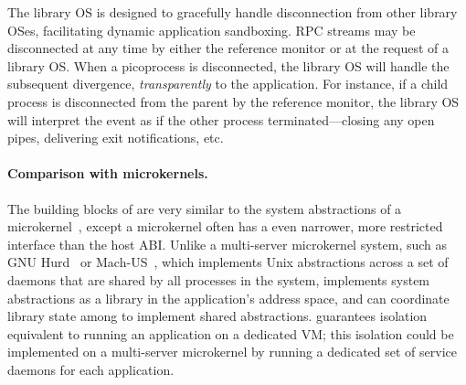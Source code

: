 The \graphene{} library OS is designed to gracefully handle disconnection from other library OSes, facilitating dynamic application sandboxing.
RPC streams may be disconnected at any time by either the reference monitor or at the request of a library OS.
When a picoprocess is disconnected, the library OS will handle the subsequent
divergence, %
{\em transparently} to the application.
For instance, if a child process is disconnected from the parent by the reference monitor, the library OS will interpret the event as if the other process terminated---closing any open pipes, delivering exit notifications, etc.



\paragraph{Comparison with microkernels.}
The building blocks of \graphene{} are very similar to the system abstractions of a 
microkernel~\cite{liedtke95sosp,klein09sel4,elphinstone13microkernels,liedtke93sosp,chen93memory,baron1985mach-1,accetta86mach}, except a microkernel often has a even narrower, more restricted interface than the host ABI.
Unlike a multi-server microkernel system, such as GNU Hurd~\cite{hurd} or Mach-US~\cite{stevenson95mach-us}, which implements Unix abstractions across a set of daemons that are shared by all processes in the system, \graphene{} implements system abstractions as a library in the application's address space, and can coordinate library state among \picoprocs{} to implement shared abstractions. \graphene{} guarantees isolation equivalent to running 
an application on a dedicated VM; this isolation could be implemented on a multi-server microkernel by running a dedicated set of service daemons for each application.

